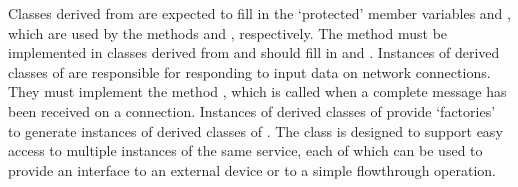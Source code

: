Classes derived from  are expected to fill in the
`protected' member variables  and
, which are used by the methods
 and , respectively.
The method  must be implemented in classes derived from
 and should fill in
 and .
Instances of derived classes of  are responsible for
responding to input data on \yarp{} network connections.
They must implement the method , which is called when a complete
message has been received on a connection.
Instances of derived classes of  provide
`factories' to generate instances of derived classes of
.
The  class is designed to support easy access
to multiple instances of the same service, each of which can be used to provide an
interface to an external device or to a simple flow\longDash{}through operation.\\


